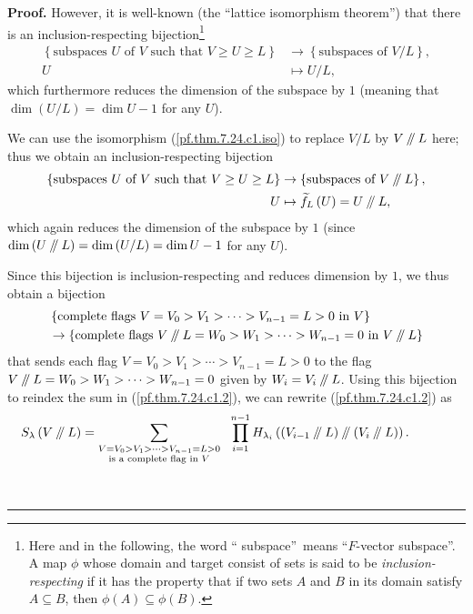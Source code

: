 \documentclass[numbers=enddot,12pt,final,onecolumn,notitlepage]{scrartcl}%
\numberwithin{exer}{section}
\theoremstyle{definition}
\newenvironment{proof}[1][Proof]{\noindent\textbf{#1.} }{\ \rule{0.5em}{0.5em}}
\let\sumnonlimits\sum
\let\prodnonlimits\prod
\renewcommand{\sum}{\sumnonlimits\limits}
\renewcommand{\prod}{\prodnonlimits\limits}
\newcommand{\sslash}{\mathbin{/\mkern-5mu/}}
\theoremstyle{plainsl}
\begin{document}
\begin{proof}
However, it is well-known (the \textquotedblleft lattice isomorphism
theorem\textquotedblright) that there is an inclusion-respecting
bijection\footnote{Here and in the following, the word \textquotedblleft
subspace\textquotedblright\ means \textquotedblleft$F$-vector
subspace\textquotedblright. A map $\phi$ whose domain and target consist of
sets is said to be \emph{inclusion-respecting} if it has the property that if
two sets $A$ and $B$ in its domain satisfy $A\subseteq B$, then $\phi\left(
A\right)  \subseteq\phi\left(  B\right)  $.}%
\begin{align*}
\left\{  \text{subspaces }U\text{ of }V\text{ such that }V\geq U\geq
L\right\}   &  \rightarrow\left\{  \text{subspaces of }V/L\right\}  ,\\
U  &  \mapsto U/L,
\end{align*}
which furthermore reduces the dimension of the subspace by $1$ (meaning that
$\dim\left(  U/L\right)  =\dim U-1$ for any $U$).

We can use the isomorphism (\ref{pf.thm.7.24.c1.iso}) to replace $V/L$ by
$V\sslash L$ here; thus we obtain an inclusion-respecting bijection%
\begin{align*}
\left\{  \text{subspaces }U\text{ of }V\text{ such that }V\geq U\geq
L\right\}   &  \rightarrow\left\{  \text{subspaces of }V\sslash L\right\}  ,\\
U  &  \mapsto\widetilde{f}_{L}\left(  U\right)  =U\sslash L,
\end{align*}
which again reduces the dimension of the subspace by $1$ (since $\dim\left(
U\sslash L\right)  =\dim\left(  U/L\right)  =\dim U-1$ for any $U$).

Since this bijection is inclusion-respecting and reduces dimension by $1$, we
thus obtain a bijection%
\begin{align*}
&  \left\{  \text{complete flags }V=V_{0}>V_{1}>\cdots>V_{n-1}=L>0\text{ in
}V\right\} \\
&  \rightarrow\left\{  \text{complete flags }V\sslash L=W_{0}>W_{1}%
>\cdots>W_{n-1}=0\text{ in }V\sslash L\right\}
\end{align*}
that sends each flag $V=V_{0}>V_{1}>\cdots>V_{n-1}=L>0$ to the flag
$V\sslash
L=W_{0}>W_{1}>\cdots>W_{n-1}=0$ given by $W_{i}=V_{i}\sslash L$. Using this
bijection to reindex the sum in (\ref{pf.thm.7.24.c1.2}), we can rewrite
(\ref{pf.thm.7.24.c1.2}) as%
\begin{equation}
S_{\lambda}\left(  V\sslash L\right)  =\sum_{\substack{V=V_{0}>V_{1}%
>\cdots>V_{n-1}=L>0\\\text{is a complete flag in }V}}\ \ \prod_{i=1}%
^{n-1}H_{\lambda_{i}}\left(  \left(  V_{i-1}\sslash L\right)  \sslash\left(
V_{i}\sslash L\right)  \right)  .\ \ \ \ \ \ \ \ \ \ \label{pf.thm.7.24.c1.3}%
\end{equation}



\end{proof}
\end{document}
